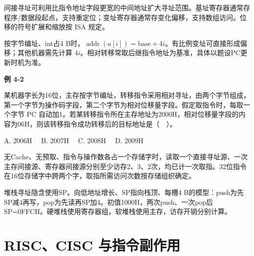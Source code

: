 间接寻址可利用比指令地址字段更宽的中间地址扩大寻址范围。基址寄存器通常存程序/数据段起点，支持重定位；变址寄存器通常存变化偏移，支持数组访问。位移的符号扩展和缩放按 ISA 规定。

按字节编址、int占4 B时，\(\operatorname{addr}(a[i])=\mathrm{base}+4i\)。有比例变址可直接形成偏移；其他机器需先计算 \(4i\)。相对转移常取后继指令地址为基准，具体以题设PC更新时机为准。

\par\medskip{}\noindent\hypertarget{CO04-E02}{}\label{CO04-E02}\textbf{例 4-2}\par\nobreak\smallskip

某机器字长为16位，主存按字节编址，转移指令采用相对寻址，由两个字节组成，第一个字节为操作码字段，第二个字节为相对位移量字段。假定取指令时，每取一个字节 PC 自动加1。若某转移指令所在主存地址为2000H，相对位移量字段的内容为06H，则该转移指令成功转移后的目标地址是（　）。

A. 2006H　 B. 2007H　 C. 2008H　 D. 2009H

无Cache、无预取、指令与操作数各占一个存储字时，读取一个直接寻址源、一次主存间接源、寄存器间接源分别至少访存2、3、2次，均已计一次取指。32位指令在16位存储字中跨两个字，取指所需访问次数按存储组织确定。

堆栈寻址隐含使用SP。向低地址增长、SP指向栈顶、每槽4 B的模型：push为先SP减4再写，pop为先读再SP加4。初值1000H，两次push、一次pop后SP=0FFCH。硬堆栈使用寄存器组，软堆栈使用主存，访存开销分别计算。

\section{RISC、CISC 与指令副作用}\label{CO04-isa}

